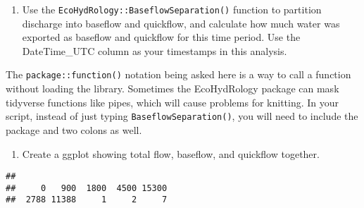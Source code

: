 \documentclass[]{article}
\newenvironment{Shaded}{\begin{snugshade}}{\end{snugshade}}
\newcommand{\KeywordTok}[1]{\textcolor[rgb]{0.13,0.29,0.53}{\textbf{#1}}}
\newcommand{\NormalTok}[1]{#1}
\newcommand{\OperatorTok}[1]{\textcolor[rgb]{0.81,0.36,0.00}{\textbf{#1}}}
\providecommand{\tightlist}{%
  \setlength{\itemsep}{0pt}\setlength{\parskip}{0pt}}
\begin{document}
\begin{enumerate}
\def\labelenumi{\arabic{enumi}.}
\setcounter{enumi}{8}
\tightlist
\item
  Use the \texttt{EcoHydRology::BaseflowSeparation()} function to
  partition discharge into baseflow and quickflow, and calculate how
  much water was exported as baseflow and quickflow for this time
  period. Use the DateTime\_UTC column as your timestamps in this
  analysis.
\end{enumerate}

The \texttt{package::function()} notation being asked here is a way to
call a function without loading the library. Sometimes the EcoHydRology
package can mask tidyverse functions like pipes, which will cause
problems for knitting. In your script, instead of just typing
\texttt{BaseflowSeparation()}, you will need to include the package and
two colons as well.

\begin{enumerate}
\def\labelenumi{\arabic{enumi}.}
\setcounter{enumi}{9}
\tightlist
\item
  Create a ggplot showing total flow, baseflow, and quickflow together.
\end{enumerate}

\begin{Shaded}
\end{Shaded}

\begin{verbatim}
## 
##     0   900  1800  4500 15300 
##  2788 11388     1     2     7
\end{verbatim}
\end{document}
